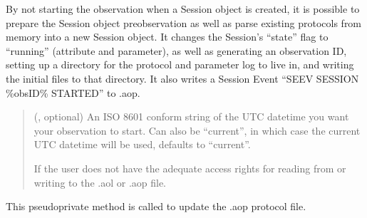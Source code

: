 \documentclass[letterpaper,10pt,english]{sphinxmanual}
\begin{document}
\begin{fulllineitems}
\begin{fulllineitems}
\sphinxAtStartPar
By not starting the observation when a Session object is created, it is
possible to prepare the Session object pre\sphinxhyphen{}observation as well as
parse existing protocols from memory into a new Session object. It
changes the Session’s “state” flag to “running” (attribute and
parameter), as well as generating an observation ID, setting up a
directory for the protocol and parameter log to live in, and writing
the initial files to that directory. It also writes a Session Event
“SEEV SESSION \%obsID\% STARTED” to .aop.
\begin{quote}\begin{description}
\sphinxAtStartPar
{} (, optional) \textendash{} An ISO 8601 conform string of the UTC datetime you want your
observation to start. Can also be “current”, in which case the current
UTC datetime will be used, defaults to “current”.

\sphinxAtStartPar
{} \textendash{} If the user does not have the adequate access rights for reading from or writing to the
.aol or .aop file.

\end{description}\end{quote}

\end{fulllineitems}


\begin{fulllineitems}
\label{\detokenize{autoapi/aop/aop/index:aop.aop.Session.__write_to_aop}}
\pysigstartsignatures
{}
\pysigstopsignatures
\sphinxAtStartPar
This pseudo\sphinxhyphen{}private method is called to update the .aop protocol file.


\end{fulllineitems}
\end{fulllineitems}
\end{document}
